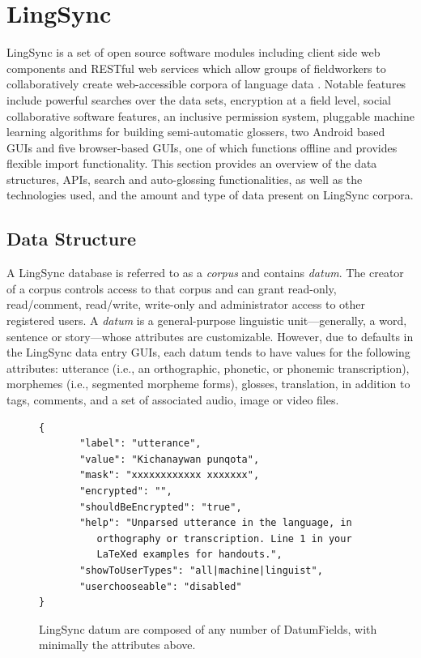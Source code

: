 \documentclass[11pt]{article}
\begin{document}
\section{LingSync}
\label{lingsync-api}
LingSync is a set of open source software modules including client side web
components and RESTful web services which allow groups of fieldworkers to
collaboratively create web-accessible corpora of language data
\cite{lingsync:2012}. Notable features include powerful searches over the data
sets, encryption at a field level, social collaborative software features, an
inclusive permission system, pluggable machine learning algorithms for building
semi-automatic glossers, two Android based GUIs and five browser-based GUIs,
one of which functions offline and provides flexible import functionality. This
section provides an overview of the data structures, APIs, search and
auto-glossing functionalities, as well as the technologies used, and the amount
and type of data present on LingSync corpora.%

\subsection{Data Structure}

A LingSync database is referred to as a \emph{corpus} and contains
\textit{datum}. The creator of a corpus controls access to that corpus and can
grant read-only, read/comment, read/write, write-only and administrator access
to other registered users. A \emph{datum} is a general-purpose linguistic
unit---generally, a word, sentence or story---whose attributes are
customizable. However, due to defaults in the LingSync data entry GUIs, each
datum tends to have values for the following attributes: utterance (i.e., an
orthographic, phonetic, or phonemic transcription), morphemes (i.e., segmented
morpheme forms), glosses, translation, in addition to tags, comments, and a set
of associated audio, image or video files. 

\begin{figure}[h]
\scriptsize
\begin{verbatim}
{
       "label": "utterance",
       "value": "Kichanaywan punqota",
       "mask": "xxxxxxxxxxxx xxxxxxx",
       "encrypted": "",
       "shouldBeEncrypted": "true",
       "help": "Unparsed utterance in the language, in 
          orthography or transcription. Line 1 in your 
          LaTeXed examples for handouts.",
       "showToUserTypes": "all|machine|linguist",
       "userchooseable": "disabled"
}
\end{verbatim}

\caption{LingSync datum are composed of any number of DatumFields, with
minimally the attributes above.}
\label{lingsync-datastructure}
\end{figure}
\end{document}
